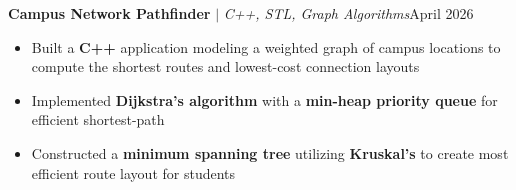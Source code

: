 \documentclass[letterpaper,10pt]{article}
\newcommand{\headerrow}[2]{#1\hfill #2\\}
\newcommand{\project}[3]{%
  \headerrow{\textbf{#1} $|$ \textit{#2}}{#3}%
}
\newenvironment{bullets}
  {\begin{itemize}[leftmargin=*,labelsep=0.5em,topsep=1pt,itemsep=0pt,parsep=0pt]}
  {\end{itemize}\vspace{1pt}}
\begin{document}
\project{Campus Network Pathfinder}{C++, STL, Graph Algorithms}{April 2026}
\begin{bullets}
  \item Built a \textbf{C++} application modeling a weighted graph of campus locations to compute the shortest routes and lowest-cost connection layouts
  \item Implemented \textbf{Dijkstra's algorithm} with a \textbf{min-heap priority queue} for efficient shortest-path
  \item Constructed a \textbf{minimum spanning tree} utilizing \textbf{Kruskal's} to create most efficient route layout for students
\end{bullets}
\end{document}
